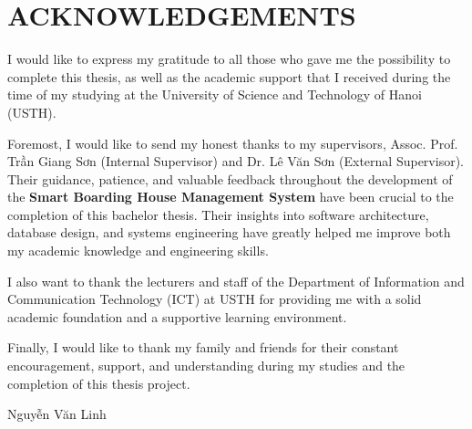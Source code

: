 \chapter*{ACKNOWLEDGEMENTS}
\thispagestyle{empty}

I would like to express my gratitude to all those who gave me the possibility to complete this thesis, as well as the academic support that I received during the time of my studying at the University of Science and Technology of Hanoi (USTH).

Foremost, I would like to send my honest thanks to my supervisors, Assoc. Prof. Trần Giang Sơn (Internal Supervisor) and Dr. Lê Văn Sơn (External Supervisor). Their guidance, patience, and valuable feedback throughout the development of the \textbf{Smart Boarding House Management System} have been crucial to the completion of this bachelor thesis. Their insights into software architecture, database design, and systems engineering have greatly helped me improve both my academic knowledge and engineering skills.

I also want to thank the lecturers and staff of the Department of Information and Communication Technology (ICT) at USTH for providing me with a solid academic foundation and a supportive learning environment.

Finally, I would like to thank my family and friends for their constant encouragement, support, and understanding during my studies and the completion of this thesis project.

\vspace{1.5cm}
\begin{flushright}
Nguyễn Văn Linh
\end{flushright}
\newpage
